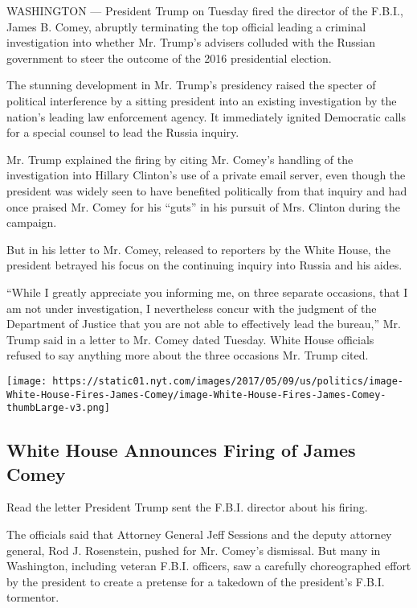 WASHINGTON --- President Trump on Tuesday fired the director of the
F.B.I., James B. Comey, abruptly terminating the top official leading a
criminal investigation into whether Mr. Trump's advisers colluded with
the Russian government to steer the outcome of the 2016 presidential
election.

The stunning development in Mr. Trump's presidency raised the specter of
political interference by a sitting president into an existing
investigation by the nation's leading law enforcement agency. It
immediately ignited Democratic calls for a special counsel to lead the
Russia inquiry.

Mr. Trump explained the firing by citing Mr. Comey's handling of the
investigation into Hillary Clinton's use of a private email server, even
though the president was widely seen to have benefited politically from
that inquiry and had once praised Mr. Comey for his ``guts'' in his
pursuit of Mrs. Clinton during the campaign.

But in his letter to Mr. Comey, released to reporters by the White
House, the president betrayed his focus on the continuing inquiry into
Russia and his aides.

``While I greatly appreciate you informing me, on three separate
occasions, that I am not under investigation, I nevertheless concur with
the judgment of the Department of Justice that you are not able to
effectively lead the bureau,'' Mr. Trump said in a letter to Mr. Comey
dated Tuesday. White House officials refused to say anything more about
the three occasions Mr. Trump cited.

\href{https://www.nytimes.com/interactive/2017/05/09/us/politics/document-White-House-Fires-James-Comey.html}{}

\texttt{[image: https://static01.nyt.com/images/2017/05/09/us/politics/image-White-House-Fires-James-Comey/image-White-House-Fires-James-Comey-thumbLarge-v3.png]}

\hypertarget{white-house-announces-firing-of-james-comey}{%
\subsection{White House Announces Firing of James
Comey}\label{white-house-announces-firing-of-james-comey}}

Read the letter President Trump sent the F.B.I. director about his
firing.

The officials said that Attorney General Jeff Sessions and the deputy
attorney general, Rod J. Rosenstein, pushed for Mr. Comey's dismissal.
But many in Washington, including veteran F.B.I. officers, saw a
carefully choreographed effort by the president to create a pretense for
a takedown of the president's F.B.I. tormentor.

